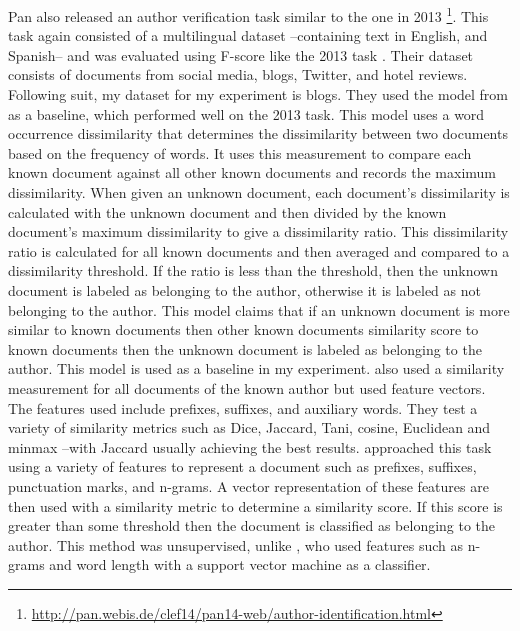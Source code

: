 \documentclass[11pt]{article}
\begin{document}
Pan also released an author verification task similar to the one in 2013 \footnote{\url{http://pan.webis.de/clef14/pan14-web/author-identification.html}}. This task again consisted of a multilingual dataset --containing text in English, and Spanish-- and was evaluated using F-score like the 2013 task \cite{pan2014}. Their dataset consists of documents from social media, blogs, Twitter, and hotel reviews. Following suit, my dataset for my experiment is blogs. They used the model from \cite{coling2014} as a baseline, which performed well on the 2013 task. This model uses a word occurrence dissimilarity that determines the dissimilarity between two documents based on the frequency of words. It uses this measurement to compare each known document against all other known documents and records the maximum dissimilarity. When given an unknown document, each document's dissimilarity is calculated with the unknown document and then divided by the known document's maximum dissimilarity to give a dissimilarity ratio. This dissimilarity ratio is calculated for all known documents and then averaged and compared to a dissimilarity threshold. If the ratio is less than the threshold, then the unknown document is labeled as belonging to the author, otherwise it is labeled as not belonging to the author. This model claims that if an unknown document is more similar to known documents then other known documents similarity score to known documents then the unknown document is labeled as belonging to the author. This model is used as a baseline in my experiment. \cite{castro} also used a similarity measurement for all documents of the known author but used feature vectors. The features used include prefixes, suffixes, and auxiliary words. They test a variety of similarity metrics such as Dice, Jaccard, Tani, cosine, Euclidean and minmax --with Jaccard usually achieving the best results. \cite{castillo:2014} approached this task using a variety of features to represent a document such as prefixes, suffixes, punctuation marks, and n-grams. A vector representation of these features are then used with a similarity metric to determine a similarity score. If this score is greater than some threshold then the document is classified as belonging to the author. This method was unsupervised, unlike \cite{moreau}, who used features such as n-grams and word length with a support vector machine as a classifier.    
\end{document}

